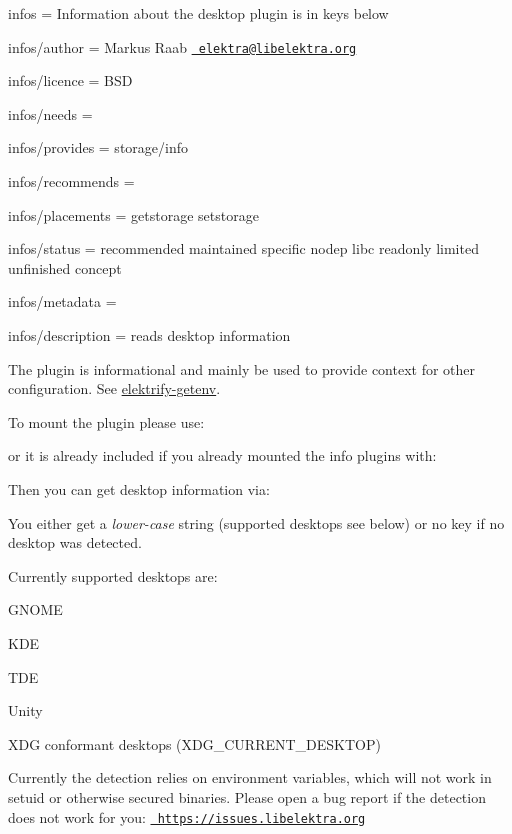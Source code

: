 
\begin{DoxyItemize}
\item infos = Information about the desktop plugin is in keys below
\item infos/author = Markus Raab \href{mailto:elektra@libelektra.org}{\texttt{ elektra@libelektra.\+org}}
\item infos/licence = B\+SD
\item infos/needs =
\item infos/provides = storage/info
\item infos/recommends =
\item infos/placements = getstorage setstorage
\item infos/status = recommended maintained specific nodep libc readonly limited unfinished concept
\item infos/metadata =
\item infos/description = reads desktop information
\end{DoxyItemize}

The plugin is informational and mainly be used to provide context for other configuration. See \mbox{\hyperlink{src_libs_getenv_README_md}{elektrify-\/getenv}}.

To mount the plugin please use\+:


\begin{DoxyCode}{0}
\end{DoxyCode}


or it is already included if you already mounted the info plugins with\+:


\begin{DoxyCode}{0}
\end{DoxyCode}


Then you can get desktop information via\+:


\begin{DoxyCode}{0}
\end{DoxyCode}


You either get a {\itshape lower-\/case} string (supported desktops see below) or no key if no desktop was detected.

Currently supported desktops are\+:


\begin{DoxyItemize}
\item G\+N\+O\+ME
\item K\+DE
\item T\+DE
\item Unity
\item X\+DG conformant desktops ({\ttfamily X\+D\+G\+\_\+\+C\+U\+R\+R\+E\+N\+T\+\_\+\+D\+E\+S\+K\+T\+OP})
\end{DoxyItemize}

Currently the detection relies on environment variables, which will not work in setuid or otherwise secured binaries. Please open a bug report if the detection does not work for you\+: \href{https://issues.libelektra.org}{\texttt{ https\+://issues.\+libelektra.\+org}} 